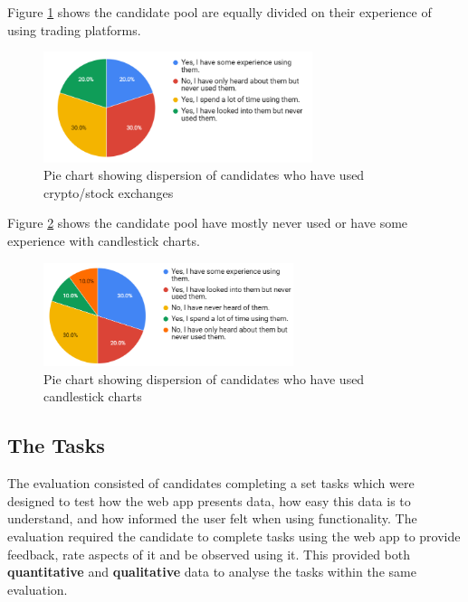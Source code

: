 \noindent Figure \ref{fig:eval:web_app:exp_with_crypto} shows the candidate pool are equally divided on their experience of using trading platforms.

  \begin{figure}[ht]
  \centering
 \includegraphics[width=0.7\textwidth]{content/graphics/exp_with_crypto.PNG}
  \caption{Pie chart showing dispersion of candidates who have used crypto/stock exchanges}
  \label{fig:eval:web_app:exp_with_crypto}
\end{figure}

\noindent Figure \ref{fig:eval:web_app:exp_with_kline} shows the candidate pool have mostly never used or have some experience with candlestick charts.

  \begin{figure}[ht]
  \centering
 \includegraphics[width=0.65\textwidth]{content/graphics/exp_with_kline.PNG}
  \caption{Pie chart showing dispersion of candidates who have used candlestick charts}
  \label{fig:eval:web_app:exp_with_kline}
\end{figure}

\subsection{The Tasks}
\label{sec:evaluation:ui:tasks}
\noindent The evaluation consisted of candidates completing a set tasks which were designed to test how the web app presents data, how easy this data is to understand, and how informed the user felt when using functionality. The evaluation required the candidate to complete tasks using the web app to provide feedback, rate aspects of it and be observed using it. This provided both \textbf{quantitative} and \textbf{qualitative} data to analyse the tasks within the same evaluation.

